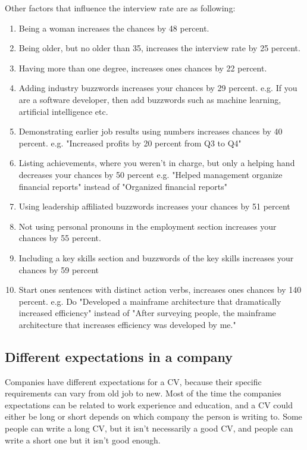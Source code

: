 Other factors that influence the interview rate are as following:
\begin{enumerate}
\item Being a woman increases the chances by 48 percent.
\item Being older, but no older than 35, increases the interview rate by 25 percent.
\item Having more than one degree, increases ones chances by 22 percent.
\item Adding industry buzzwords increases your chances by 29 percent.
   e.g. If you are a software developer, then add buzzwords such as machine learning,
   artificial intelligence etc.
\item Demonstrating earlier job results using numbers increases chances by 40 percent.
   e.g. "Increased profits by 20 percent from Q3 to Q4"
\item Listing achievements, where you weren't in charge, but only a helping hand
 decreases your chances by 50 percent
   e.g. "Helped management organize financial reports" instead of "Organized financial reports"
\item Using leadership affiliated buzzwords increases your chances by 51 percent
\item Not using personal pronouns in the employment section increases your
chances by 55 percent.
\item Including a key skills section and buzzwords of the key skills increases your
 chances by 59 percent
\item Start ones sentences with distinct action verbs, increases ones chances by 140 percent.
   e.g. Do "Developed a mainframe architecture that dramatically increased efficiency"
   instead of "After surveying people, the mainframe architecture that increases efficiency was
   developed by me."\cite{Science_job}
\end{enumerate}






\subsection{Different expectations in a company}
Companies have different expectations for a CV, because their specific requirements can vary from old job to new.
Most of the time the companies expectations can be related to work experience and education,
and a CV could either be long or short depends on which company the person is writing to. Some people can write a long CV,
but it isn't necessarily a good CV, and people can write a short one but it isn't good enough. \\

